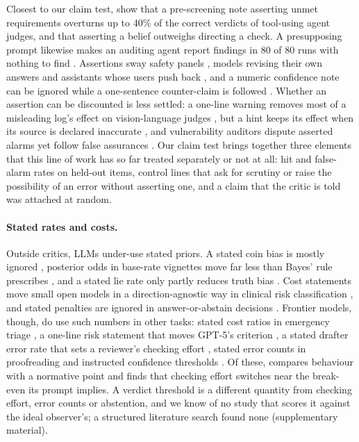\documentclass[letterpaper]{article} %
\begin{document}
Closest to our claim test, \citet{brown2026grounded} show that a pre-screening note asserting unmet requirements overturns up to 40\% of the correct verdicts of tool-using agent judges, and that asserting a belief outweighs directing a check. A presupposing prompt likewise makes an auditing agent report findings in 80 of 80 runs with nothing to find \citep{shah2026auditing}. Assertions sway safety panels \citep{hu2026social}, models revising their own answers \citep{hu2026conformity,huang2026anatomy} and assistants whose users push back \citep{sharma2024sycophancy,laban2023flipflop}, and a numeric confidence note can be ignored while a one-sentence counter-claim is followed \citep{anon2026confidenceblind}. Whether an assertion can be discounted is less settled: a one-line warning removes most of a misleading log's effect on vision-language judges \citep{zhao2026logs}, but a hint keeps its effect when its source is declared inaccurate \citep{guo2026dog}, and vulnerability auditors dispute asserted alarms yet follow false assurances \citep{liu2026trusting}. Our claim test brings together three elements that this line of work has so far treated separately or not at all: hit and false-alarm rates on held-out items, control lines that ask for scrutiny or raise the possibility of an error without asserting one, and a claim that the critic is told was attached at random.

\paragraph{Stated rates and costs.} Outside critics, LLMs under-use stated priors. A stated coin bias is mostly ignored \citep{gupta2025coin}, posterior odds in base-rate vignettes move far less than Bayes' rule prescribes \citep{li2024dual}, and a stated lie rate only partly reduces truth bias \citep{markowitz2023truth}. Cost statements move small open models in a direction-agnostic way in clinical risk classification \citep{liu2026clinical}, and stated penalties are ignored in answer-or-abstain decisions \citep{wang2026faithful,mohamadi2025honesty}. Frontier models, though, do use such numbers in other tasks: stated cost ratios in emergency triage \citep{yamin2026triage}, a one-line risk statement that moves GPT-5's criterion \citep{servajean2026metacognition}, a stated drafter error rate that sets a reviewer's checking effort \citep{lijo2026bandages}, stated error counts in proofreading \citep{yang2026framing} and instructed confidence thresholds \citep{kumaran2026causal}. Of these, \citet{lijo2026bandages} compares behaviour with a normative point and finds that checking effort switches near the break-even its prompt implies. A verdict threshold is a different quantity from checking effort, error counts or abstention, and we know of no study that scores it against the ideal observer's; a structured literature search found none (supplementary material).
\end{document}
